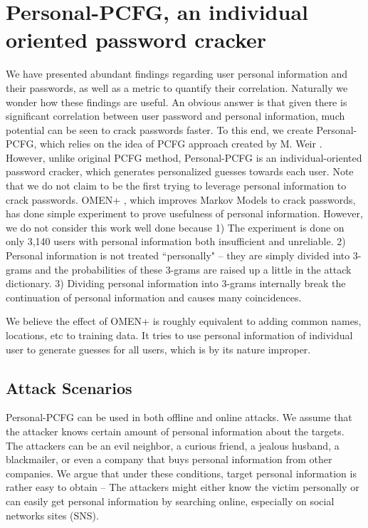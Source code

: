 \section{Personal-PCFG, an individual oriented password cracker}
\label{personalpcfg}
We have presented abundant findings regarding user personal information and their passwords, as well as a metric to quantify their correlation. Naturally we wonder how these findings are useful. An obvious answer is that given there is significant correlation between user password and personal information, much potential can be seen to crack passwords faster. To this end, we create Personal-PCFG, which relies on the idea of PCFG approach created by M. Weir \cite{weir2009password}. However, unlike original PCFG method, Personal-PCFG is an individual-oriented password cracker, which generates personalized guesses towards each user. Note that we do not claim to be the first trying to leverage personal information to crack passwords. OMEN+ \cite{castelluccia2013privacy}, which improves Markov Models \cite{narayanan2005fast} to crack passwords, has done simple experiment to prove usefulness of personal information. However, we do not consider this work well done because 1) The experiment is done on only 3,140 users with personal information both insufficient and unreliable. 2) Personal information is not treated ``personally" -- they are simply divided into 3-grams and the probabilities of these 3-grams are raised up a little in the attack dictionary. 3) Dividing personal information into 3-grams internally break the continuation of personal information and causes many coincidences. 

We believe the effect of OMEN+ \cite{castelluccia2013privacy} is roughly equivalent to adding common names, locations, etc to training data. It tries to use personal information of individual user to generate guesses for all users, which is by its nature improper. 

\subsection{Attack Scenarios}
Personal-PCFG can be used in both offline and online attacks. We assume that the attacker knows certain amount of personal information about the targets. The attackers can be an evil neighbor, a curious friend, a jealous husband, a blackmailer, or even a company that buys personal information from other companies. We argue that under these conditions, target personal information is rather easy to obtain -- The attackers might either know the victim personally or can easily get personal information by searching online, especially on social networks sites (SNS). 

